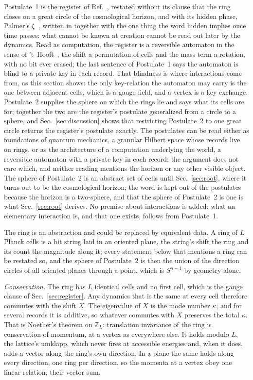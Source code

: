 \documentclass[aps,prd,twocolumn,superscriptaddress,nofootinbib]{revtex4-2}
\begin{document}
Postulate~1 is the register of Ref.~\cite{korytko2026c}, restated without its clause that the ring closes on a great circle of the cosmological horizon, and with its hidden phase, Palmer's $\xi$~\cite{palmer2026c}, written in together with the one thing the word hidden implies once time passes: what cannot be known at creation cannot be read out later by the dynamics. Read as computation, the register is a reversible automaton in the sense of 't~Hooft~\cite{thooft2016}, the shift a permutation of cells and the mass term a rotation, with no bit ever erased; the last sentence of Postulate~1 says the automaton is blind to a private key in each record. That blindness is where interactions come from, as this section shows: the only key-relation the automaton may carry is the one between adjacent cells, which is a gauge field, and a vertex is a key exchange. Postulate~2 supplies the sphere on which the rings lie and says what its cells are for; together the two are the register's postulate generalized from a circle to a sphere, and Sec.~\ref{sec:discussion} shows that restricting Postulate~2 to one great circle returns the register's postulate exactly. The postulates can be read either as foundations of quantum mechanics, a granular Hilbert space whose records live on rings, or as the architecture of a computation underlying the world, a reversible automaton with a private key in each record; the argument does not care which, and neither reading mentions the horizon or any other visible object. The sphere of Postulate~2 is an abstract set of cells until Sec.~\ref{sec:root}, where it turns out to be the cosmological horizon; the word is kept out of the postulates because the horizon is a two-sphere, and that the sphere of Postulate~2 is one is what Sec.~\ref{sec:root} derives. No premise about interactions is added; what an elementary interaction is, and that one exists, follows from Postulate~1.

The ring is an abstraction and could be replaced by equivalent data. A ring of $L$ Planck cells is a bit string laid in an oriented plane, the string's shift the ring and its count the magnitude along it; every statement below that mentions a ring can be restated so, and the sphere of Postulate~2 is then the union of the direction circles of all oriented planes through a point, which is $S^{n-1}$ by geometry alone.

\textit{Conservation.} The ring has $L$ identical cells and no first cell, which is the gauge clause of Sec.~\ref{sec:register}. Any dynamics that is the same at every cell therefore commutes with the shift $X$. The eigenvalue of $X$ is the mode number $\kappa$, and for several records it is additive, so whatever commutes with $X$ preserves the total $\kappa$. That is Noether's theorem on $\mathbb{Z}_L$: translation invariance of the ring is conservation of momentum, at a vertex as everywhere else. It holds modulo $L$, the lattice's umklapp, which never fires at accessible energies and, when it does, adds a vector along the ring's own direction. In a plane the same holds along every direction, one ring per direction, so the momenta at a vertex obey one linear relation, their vector sum.
\end{document}
